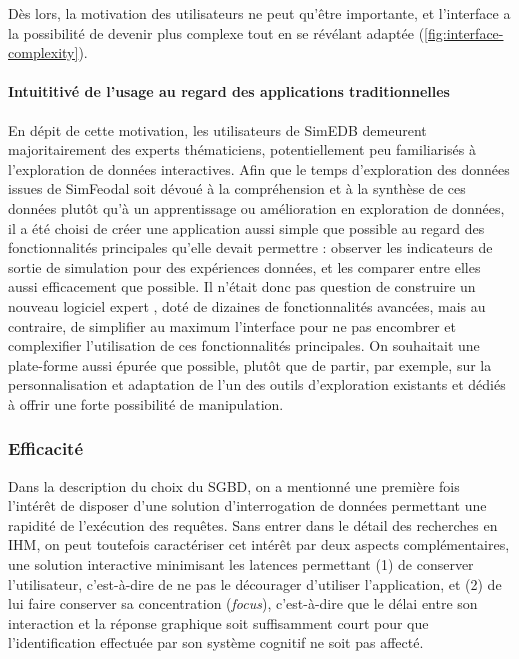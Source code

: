 Dès lors, la motivation des utilisateurs ne peut qu'être importante, et l'interface a la possibilité de devenir plus complexe tout en se révélant adaptée (\cref{fig:interface-complexity}).

\paragraph*{Intuititivé de l'usage au regard des applications traditionnelles}

En dépit de cette motivation, les utilisateurs de SimEDB demeurent majoritairement des experts thématiciens, potentiellement peu familiarisés à l'exploration de données interactives.
Afin que le temps d'exploration des données issues de SimFeodal soit dévoué à la compréhension et à la synthèse de ces données plutôt qu'à un apprentissage ou amélioration en exploration de données, il a été choisi de créer une application aussi simple que possible au regard des fonctionnalités principales qu'elle devait permettre : observer les indicateurs de sortie de simulation pour des expériences données, et les comparer entre elles aussi efficacement que possible.
Il n'était donc pas question de construire un nouveau \og logiciel expert \fg{}, doté de dizaines de fonctionnalités avancées, mais au contraire, de simplifier au maximum l'interface pour ne pas encombrer et complexifier l'utilisation de ces fonctionnalités principales.
On souhaitait une plate-forme aussi épurée que possible, plutôt que de partir, par exemple, sur la personnalisation et adaptation de l'un des outils d'exploration existants et dédiés à offrir une forte possibilité de manipulation.

\subsubsection{Efficacité}

Dans la description du choix du SGBD, on a mentionné une première fois l'intérêt de disposer d'une solution d'interrogation de données permettant une rapidité de l'exécution des requêtes.
Sans entrer dans le détail des recherches en IHM, on peut toutefois caractériser cet intérêt par deux aspects complémentaires, une solution interactive minimisant les latences permettant (1) de conserver l'utilisateur, c'est-à-dire de ne pas le décourager d'utiliser l'application, et (2) de lui faire conserver sa concentration (\textit{focus}), c'est-à-dire que le délai entre son interaction et la réponse graphique soit suffisamment court pour que l'identification effectuée par son système cognitif ne soit pas affecté.


